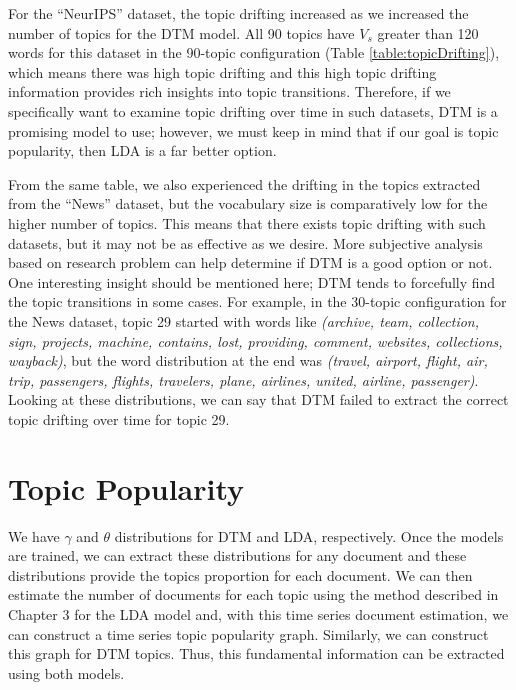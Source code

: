 \documentclass[a4paper]{report}
\begin{document}
For the ``NeurIPS'' dataset, the topic drifting increased as we increased the number of topics for the DTM model. All 90 topics have  $V_s$ greater than 120 words for this dataset in the 90-topic configuration (Table \ref{table:topicDrifting}), which means there was high topic drifting and this high topic drifting information provides rich insights into topic transitions. Therefore, if we specifically want to examine topic drifting over time in such datasets, DTM is a promising model to use; however, we must keep in mind that if our goal is topic popularity, then LDA is a far better option. 

From the same table, we also experienced the drifting in the topics extracted from the ``News'' dataset, but the vocabulary size is comparatively low for the higher number of topics. This means that there exists topic drifting with such datasets, but it may not be as effective as we desire. More subjective analysis based on research problem can help determine if DTM is a good option or not. One interesting insight should be mentioned here; DTM tends to forcefully find the topic transitions in some cases. For example, in the 30-topic configuration for the News dataset, topic 29 started with words like \textit{(archive, team, collection, sign, projects, machine, contains, lost, providing, comment, websites, collections, wayback)}, but the word distribution at the end was \textit{(travel, airport, flight, air, trip, passengers, flights, travelers, plane, airlines, united, airline, passenger)}. Looking at these distributions, we can say that DTM failed to extract the correct topic drifting over time for topic 29.

\section{Topic Popularity} 
We have $\gamma$ and $\theta$ distributions for DTM and LDA, respectively. Once the models are trained, we can extract these distributions for any document and these distributions provide the topics proportion for each document. We can then estimate the number of documents for each topic using the method described in Chapter 3 for the LDA model and, with this time series document estimation, we can construct a time series topic popularity graph. Similarly, we can construct this graph for DTM topics. Thus, this fundamental information can be extracted using both models. 
\end{document}
